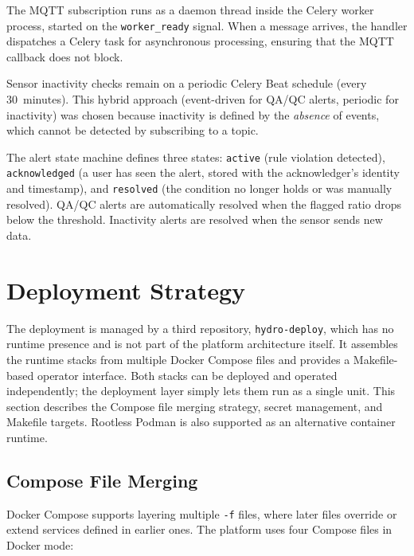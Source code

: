 The MQTT subscription runs as a daemon thread inside the Celery worker process, started on the
\texttt{worker\_ready} signal. When a message arrives, the handler dispatches a Celery task
for asynchronous processing, ensuring that the MQTT callback does not block.

Sensor inactivity checks remain on a periodic Celery Beat schedule (every 30~minutes). This
hybrid approach (event-driven for QA/QC alerts, periodic for inactivity) was chosen
because inactivity is defined by the \emph{absence} of events, which cannot be detected by
subscribing to a topic.

The alert state machine defines three states: \texttt{active} (rule violation detected),
\texttt{acknowledged} (a user has seen the alert, stored with the acknowledger's identity
and timestamp), and \texttt{resolved} (the condition no longer holds or was manually
resolved). QA/QC alerts are automatically resolved when the flagged ratio drops below
the threshold. Inactivity alerts are resolved when the sensor sends new data.

\section{Deployment Strategy}
\label{sec:arch-deployment}

The deployment is managed by a third repository, \texttt{hydro-deploy}, which has no
runtime presence and is not part of the platform architecture itself. It assembles the
runtime stacks from multiple Docker Compose files and provides a Makefile-based operator
interface. Both stacks can be deployed and operated independently; the deployment layer
simply lets them run as a single unit. This section describes the Compose file merging
strategy, secret management, and Makefile targets.
Rootless Podman is also supported as an alternative container runtime.

\subsection{Compose File Merging}
\label{sec:arch-deploy-compose}

Docker Compose supports layering multiple \texttt{-f} files, where later files override or
extend services defined in earlier ones. The platform uses four Compose files in Docker mode:

